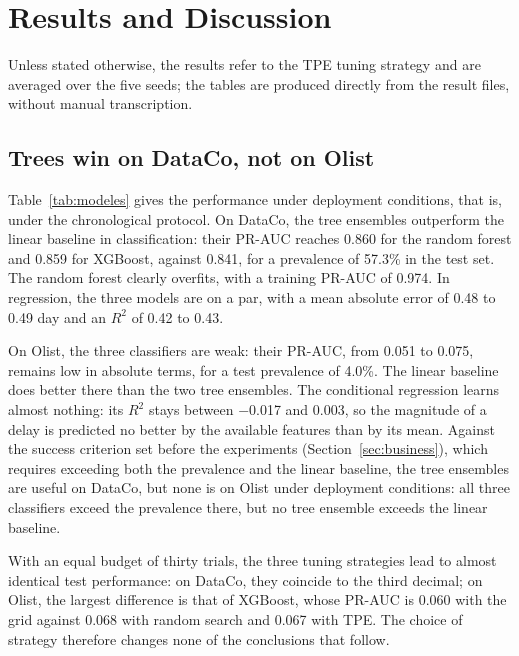 \documentclass[11pt,a4paper]{article}
\theoremstyle{definition}
\begin{document}
\section{Results and Discussion}
\label{sec:results}

Unless stated otherwise, the results refer to the TPE tuning strategy and are averaged over the five seeds; the tables are produced directly from the result files, without manual transcription.

\subsection{Trees win on DataCo, not on Olist}
\label{sec:res-modeles}

Table~\ref{tab:modeles} gives the performance under deployment conditions, that is, under the chronological protocol. On DataCo, the tree ensembles outperform the linear baseline in classification: their PR-AUC reaches 0.860 for the random forest and 0.859 for XGBoost, against 0.841, for a prevalence of 57.3\% in the test set. The random forest clearly overfits, with a training PR-AUC of 0.974. In regression, the three models are on a par, with a mean absolute error of 0.48 to 0.49 day and an $R^2$ of 0.42 to 0.43.

On Olist, the three classifiers are weak: their PR-AUC, from 0.051 to 0.075, remains low in absolute terms, for a test prevalence of 4.0\%. The linear baseline does better there than the two tree ensembles. The conditional regression learns almost nothing: its $R^2$ stays between $-$0.017 and 0.003, so the magnitude of a delay is predicted no better by the available features than by its mean. Against the success criterion set before the experiments (Section~\ref{sec:business}), which requires exceeding both the prevalence and the linear baseline, the tree ensembles are useful on DataCo, but none is on Olist under deployment conditions: all three classifiers exceed the prevalence there, but no tree ensemble exceeds the linear baseline.

With an equal budget of thirty trials, the three tuning strategies lead to almost identical test performance: on DataCo, they coincide to the third decimal; on Olist, the largest difference is that of XGBoost, whose PR-AUC is 0.060 with the grid against 0.068 with random search and 0.067 with TPE. The choice of strategy therefore changes none of the conclusions that follow.
\end{document}
